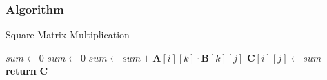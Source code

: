 \begin{frame}
  \frametitle{Algorithm}

  \begin{algorithm}[H]\caption{Square Matrix Multiplication}
    \setlength{\lineskip}{7pt}
    \begin{algorithmic}[1]
      \State $sum \gets 0$
        \State $sum \gets 0$
          \State $sum \gets  sum + \textbf{A}[i][k] \cdot \textbf{B}[k][j]$
        \EndFor
        \State $\textbf{C}[i][j] \gets  sum $
        \EndFor
        \EndFor
        \State \textbf{return} $\textbf{C}$
     \EndFunction
    \end{algorithmic}
  \end{algorithm}
\end{frame}


